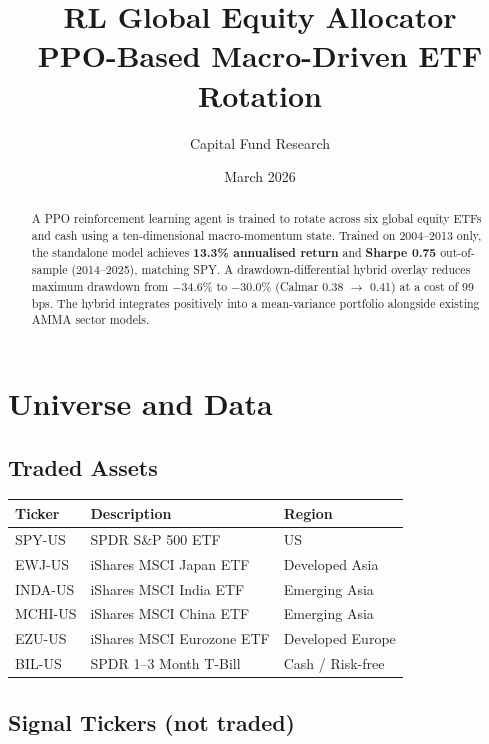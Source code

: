 \documentclass[11pt, a4paper]{article}
\title{
  \vspace{-1cm}
  \Large\textbf{RL Global Equity Allocator} \\[0.4em]
  \large PPO-Based Macro-Driven ETF Rotation
}
\author{Capital Fund Research}
\date{March 2026}
\begin{document}
\maketitle
\thispagestyle{empty}

\begin{abstract}
A PPO reinforcement learning agent is trained to rotate across six global equity ETFs and cash using a ten-dimensional macro-momentum state. Trained on 2004--2013 only, the standalone model achieves \textbf{13.3\% annualised return} and \textbf{Sharpe 0.75} out-of-sample (2014--2025), matching SPY. A drawdown-differential hybrid overlay reduces maximum drawdown from $-$34.6\% to $-$30.0\% (Calmar 0.38 $\to$ 0.41) at a cost of 99\,bps. The hybrid integrates positively into a mean-variance portfolio alongside existing AMMA sector models.
\end{abstract}

\tableofcontents
\newpage

\section{Universe and Data}

\subsection{Traded Assets}

\begin{center}
\begin{tabular}{lll}
\toprule
\textbf{Ticker} & \textbf{Description} & \textbf{Region} \\
\midrule
SPY-US  & SPDR S\&P 500 ETF         & US \\
EWJ-US  & iShares MSCI Japan ETF    & Developed Asia \\
INDA-US & iShares MSCI India ETF    & Emerging Asia \\
MCHI-US & iShares MSCI China ETF    & Emerging Asia \\
EZU-US  & iShares MSCI Eurozone ETF & Developed Europe \\
BIL-US  & SPDR 1--3 Month T-Bill    & Cash / Risk-free \\
\bottomrule
\end{tabular}
\end{center}

\subsection{Signal Tickers (not traded)}
\end{document}
